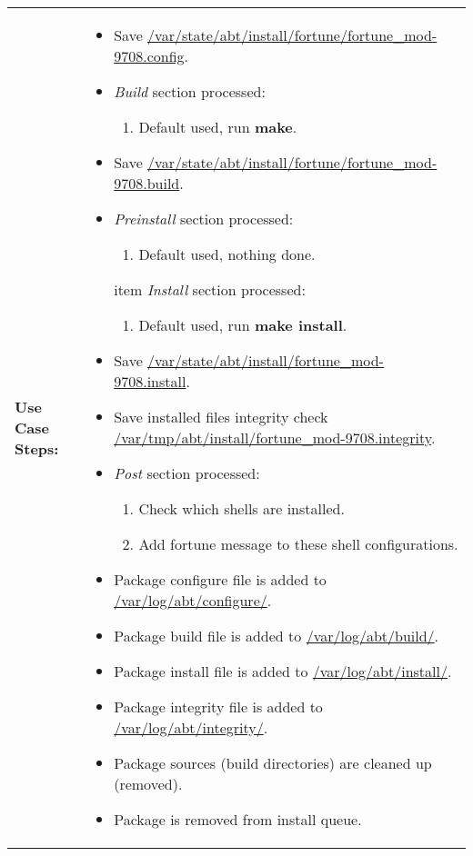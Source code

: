 \begin{tabularx}{\linewidth}{|l|X|}
\hline
\textbf{Use Case Steps:} & 
\begin{minipage}{\linewidth}
  \vspace{0.05em}
  \begin{itemize}
    \item Save \url{/var/state/abt/install/fortune/fortune_mod-9708.config}.
    \item \emph{Build} section processed:
    \begin{enumerate}
      \item Default used, run \textbf{make}.
    \end{enumerate}
    \item Save \url{/var/state/abt/install/fortune/fortune_mod-9708.build}.
    \item \emph{Preinstall} section processed:
    \begin{enumerate}
      \item Default used, nothing done.
    \end{enumerate}
    item \emph{Install} section processed:
    \begin{enumerate}
      \item Default used, run \textbf{make install}.
    \end{enumerate}
    \item Save \url{/var/state/abt/install/fortune_mod-9708.install}.
    \item Save installed files integrity check \url{/var/tmp/abt/install/fortune_mod-9708.integrity}.
    \item \emph{Post} section processed:
    \begin{enumerate}
      \item Check which shells are installed.
      \item Add fortune message to these shell configurations.
    \end{enumerate}
    \item Package configure file is added to \url{/var/log/abt/configure/}.
    \item Package build file is added to \url{/var/log/abt/build/}.
    \item Package install file is added to \url{/var/log/abt/install/}.
    \item Package integrity file is added to \url{/var/log/abt/integrity/}.
    \item Package sources (build directories) are cleaned up (removed).
    \item Package is removed from install queue.

\end{itemize}
\end{minipage}
\end{tabularx}
